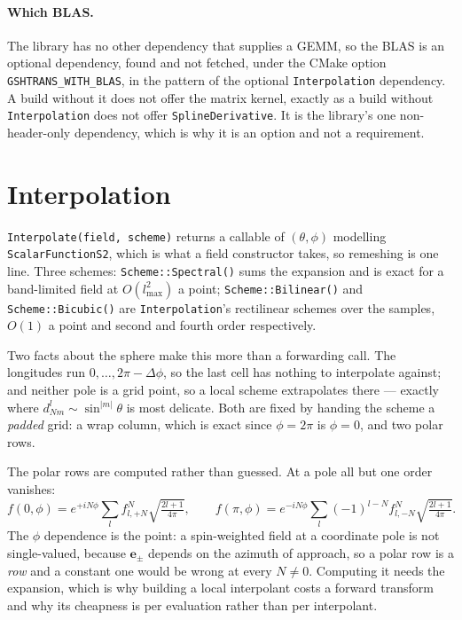 \documentclass[11pt,a4paper]{article}
\newcommand{\ebasis}[1]{\mathbf{e}_{#1}}
\newcommand{\code}[1]{\texttt{#1}}
\begin{document}
\paragraph{Which BLAS.}
\label{sec:gemmblas}
The library has no other dependency that supplies a GEMM, so the BLAS is
an optional dependency, found and not fetched, under the CMake option
\code{GSHTRANS\_WITH\_BLAS}, in the pattern of the optional
\code{Interpolation} dependency.  A build without it does not offer the
matrix kernel, exactly as a build without \code{Interpolation} does not
offer \code{SplineDerivative}.  It is the library's one
non-header-only dependency, which is why it is an option and not a
requirement.

\section{Interpolation}
\label{sec:interpolation}

\code{Interpolate(field, scheme)} returns a callable of $(\theta,\phi)$
modelling \code{ScalarFunctionS2}, which is what a field constructor takes,
so remeshing is one line.  Three schemes: \code{Scheme::Spectral()} sums the
expansion and is exact for a band-limited field at $O(l_{\max}^2)$ a point;
\code{Scheme::Bilinear()} and \code{Scheme::Bicubic()} are
\code{Interpolation}'s rectilinear schemes over the samples, $O(1)$ a point
and second and fourth order respectively.

Two facts about the sphere make this more than a forwarding call.  The
longitudes run $0,\dots,2\pi-\Delta\phi$, so the last cell has nothing to
interpolate against; and neither pole is a grid point, so a local scheme
extrapolates there --- exactly where $d^l_{Nm}\sim\sin^{|m|}\theta$ is most
delicate.  Both are fixed by handing the scheme a \emph{padded} grid: a wrap
column, which is exact since $\phi=2\pi$ is $\phi=0$, and two polar rows.

The polar rows are computed rather than guessed.  At a pole all but one order
vanishes:
\begin{equation}
  f(0,\phi) = e^{+iN\phi}\sum_{l} f^{N}_{l,+N}\sqrt{\tfrac{2l+1}{4\pi}},
  \qquad
  f(\pi,\phi) = e^{-iN\phi}\sum_{l} (-1)^{l-N} f^{N}_{l,-N}
                 \sqrt{\tfrac{2l+1}{4\pi}} .
  \label{eq:polerows}
\end{equation}
The $\phi$ dependence is the point: a spin-weighted field at a coordinate
pole is not single-valued, because $\ebasis{\pm}$ depends on the azimuth of
approach, so a polar row is a \emph{row} and a constant one would be wrong at
every $N\neq 0$.  Computing it needs the expansion, which is why building a
local interpolant costs a forward transform and why its cheapness is per
evaluation rather than per interpolant.
\end{document}
